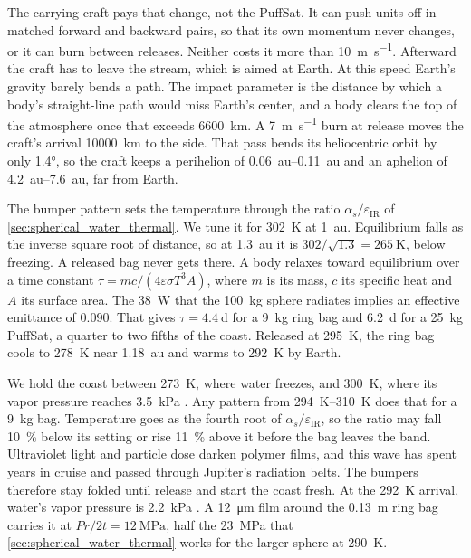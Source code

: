 \documentclass{article}
\begin{document}
The carrying craft pays that change, not the PuffSat. It can push units off in matched forward and backward pairs, so that its own momentum never changes, or it can burn between releases. Neither costs it more than \SI{10}{\meter\per\second}. Afterward the craft has to leave the stream, which is aimed at Earth. At this speed Earth's gravity barely bends a path. The impact parameter is the distance by which a body's straight-line path would miss Earth's center, and a body clears the top of the atmosphere once that exceeds \SI{6600}{\kilo\meter}. A \SI{7}{\meter\per\second} burn at release moves the craft's arrival \SI{10000}{\kilo\meter} to the side. That pass bends its heliocentric orbit by only \ang{1.4}, so the craft keeps a perihelion of \SIrange{0.06}{0.11}{\astronomicalunit} and an aphelion of \SIrange{4.2}{7.6}{\astronomicalunit}, far from Earth.

The bumper pattern sets the temperature through the ratio $\alpha_s/\varepsilon_\mathrm{IR}$ of \autoref{sec:spherical_water_thermal}. We tune it for \SI{302}{\kelvin} at \SI{1}{\astronomicalunit}. Equilibrium falls as the inverse square root of distance, so at \SI{1.3}{\astronomicalunit} it is $302/\sqrt{1.3} = \SI{265}{\kelvin}$, below freezing. A released bag never gets there. A body relaxes toward equilibrium over a time constant $\tau = mc/(4\varepsilon\sigma T^{3}A)$, where $m$ is its mass, $c$ its specific heat and $A$ its surface area. The \SI{38}{\watt} that the \SI{100}{\kilo\gram} sphere radiates implies an effective emittance of \num{0.090}. That gives $\tau = \SI{4.4}{\day}$ for a \SI{9}{\kilo\gram} ring bag and \SI{6.2}{\day} for a \SI{25}{\kilo\gram} PuffSat, a quarter to two fifths of the coast. Released at \SI{295}{\kelvin}, the ring bag cools to \SI{278}{\kelvin} near \SI{1.18}{\astronomicalunit} and warms to \SI{292}{\kelvin} by Earth.

We hold the coast between \SI{273}{\kelvin}, where water freezes, and \SI{300}{\kelvin}, where its vapor pressure reaches \SI{3.5}{\kilo\pascal} \cite{nist_webbook_water}. Any pattern from \SIrange{294}{310}{\kelvin} does that for a \SI{9}{\kilo\gram} bag. Temperature goes as the fourth root of $\alpha_s/\varepsilon_\mathrm{IR}$, so the ratio may fall \SI{10}{\percent} below its setting or rise \SI{11}{\percent} above it before the bag leaves the band. Ultraviolet light and particle dose darken polymer films, and this wave has spent years in cruise and passed through Jupiter's radiation belts. The bumpers therefore stay folded until release and start the coast fresh. At the \SI{292}{\kelvin} arrival, water's vapor pressure is \SI{2.2}{\kilo\pascal} \cite{nist_webbook_water}. A \SI{12}{\micro\meter} film around the \SI{0.13}{\meter} ring bag carries it at $Pr/2t = \SI{12}{\mega\pascal}$, half the \SI{23}{\mega\pascal} that \autoref{sec:spherical_water_thermal} works for the larger sphere at \SI{290}{\kelvin}.
\end{document}
